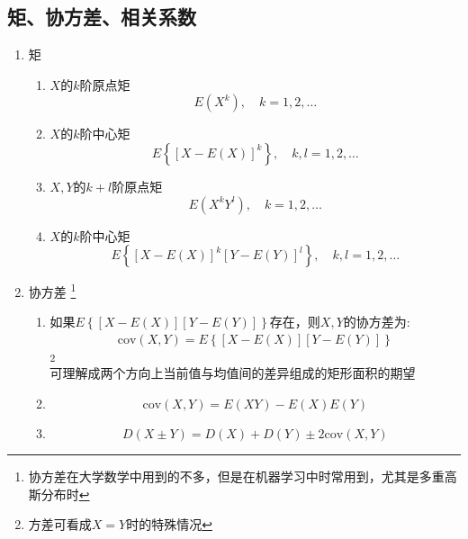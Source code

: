 \subsection{矩、协方差、相关系数}
\begin{enumerate}
	\item 矩
	\begin{enumerate}
		\item $X$的$k$阶原点矩
		\begin{equation}
			E(X^k), \quad k = 1, 2, \dots
		\end{equation}

		\item $X$的$k$阶中心矩
		\begin{equation}
			E\left\{\left[X-E(X) \right]^k\right\}, \quad k,l = 1, 2, \dots
		\end{equation}

		\item $X,Y$的$k+l$阶原点矩
		\begin{equation}
			E(X^kY^l), \quad k = 1, 2, \dots
		\end{equation}

		\item $X$的$k$阶中心矩
		\begin{equation}
			E\left\{\left[X-E(X) \right]^k \left[Y-E(Y) \right]^l\right\}, \quad k,l = 1, 2, \dots
		\end{equation}
	\end{enumerate}
	
	\item 协方差 
	\footnote{协方差在大学数学中用到的不多，但是在机器学习中时常用到，尤其是多重高斯分布时} \\
	\begin{enumerate}
		\item 如果$E\left\{\left[X-E(X)\right]\left[Y-E(Y)\right]\right\}$存在，则$X,Y$的协方差为:
		\begin{align}
			\mathrm{cov}(X,Y) = E\left\{\left[X-E(X)\right]\left[Y-E(Y)\right]\right\}
		\end{align}
		\footnote{方差可看成$X=Y$时的特殊情况} \\
		可理解成两个方向上当前值与均值间的差异组成的矩形面积的期望
		\item 
		\begin{equation}
			\mathrm{cov}(X,Y) = E(XY) - E(X)E(Y)
		\end{equation}

		\item 
		\begin{equation}
			D(X\pm Y) = D(X) + D(Y) \pm 2\mathrm{cov}(X,Y)
		\end{equation}


\end{enumerate}
\end{enumerate}
